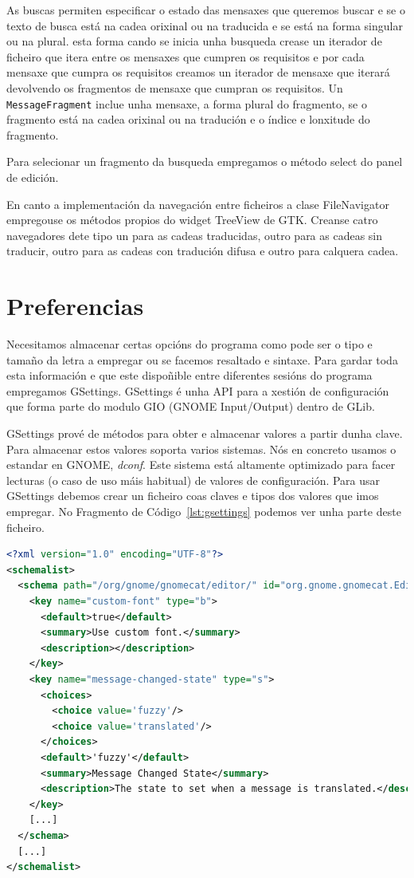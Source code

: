 As buscas permiten especificar o estado das mensaxes que queremos buscar e se o texto de busca está na cadea orixinal ou na traducida e se está na forma singular ou na plural. esta forma cando se inicia unha busqueda crease un iterador de ficheiro que itera entre os mensaxes que cumpren os requisitos e por cada mensaxe que cumpra os requisitos creamos un iterador de mensaxe que iterará devolvendo os fragmentos de mensaxe que cumpran os requisitos. Un \lstinline{MessageFragment} inclue unha mensaxe, a forma plural do fragmento, se o fragmento está na cadea orixinal ou na tradución e o índice e lonxitude do fragmento.

Para selecionar un fragmento da busqueda empregamos o método select do panel de edición.

En canto a implementación da navegación entre ficheiros a clase FileNavigator empregouse os métodos propios do widget TreeView de GTK. Creanse catro navegadores dete tipo un para as cadeas traducidas, outro para as cadeas sin traducir, outro para as cadeas con tradución difusa e outro para calquera cadea.

\section{Preferencias}
Necesitamos almacenar certas opcións do programa como pode ser o tipo e tamaño da letra a empregar ou se facemos resaltado e sintaxe. Para gardar toda esta información e que este dispoñible entre diferentes sesións do programa empregamos GSettings. GSettings é unha API para a xestión de configuración que forma parte do modulo GIO (GNOME Input/Output) dentro de GLib.

GSettings prové de métodos para obter e almacenar valores a partir dunha clave. Para almacenar estos valores soporta varios sistemas. Nós en concreto usamos o estandar en GNOME, \emph{dconf}. Este sistema está altamente optimizado para facer lecturas (o caso de uso máis habitual) de valores de configuración. Para usar GSettings debemos crear un ficheiro coas claves e tipos dos valores que imos empregar. No Fragmento de Código~\ref{lst:gsettings} podemos ver unha parte deste ficheiro.

\begin{lstlisting}[language=XML,label=lst:gsettings,caption=Fragmento da dos esquemas creados de GSettings]
<?xml version="1.0" encoding="UTF-8"?>
<schemalist>
  <schema path="/org/gnome/gnomecat/editor/" id="org.gnome.gnomecat.Editor">
    <key name="custom-font" type="b">
      <default>true</default>
      <summary>Use custom font.</summary>
      <description></description>
    </key>
    <key name="message-changed-state" type="s">
      <choices>
        <choice value='fuzzy'/>
        <choice value='translated'/>
      </choices>
      <default>'fuzzy'</default>
      <summary>Message Changed State</summary>
      <description>The state to set when a message is translated.</description>
    </key>
    [...]
  </schema>
  [...]
</schemalist>
\end{lstlisting}

